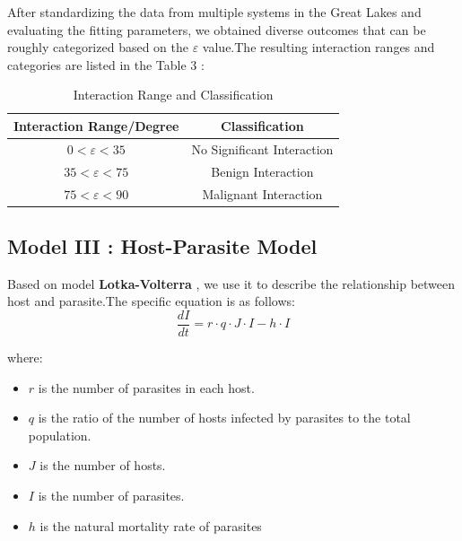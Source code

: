 \documentclass[12pt]{article}  %
\begin{document}
After standardizing the data from multiple systems in the Great Lakes and evaluating the fitting parameters, we obtained diverse outcomes that can be roughly categorized based on the $\varepsilon$ value.The resulting interaction ranges and categories are listed in the Table 3 :

\begin{table}[htbp]
	\begin{center}
		\caption{Interaction Range and Classification}
		\resizebox{\textwidth}{!}
		{\begin{tabular}{c c}
				\toprule[2pt]
				\multicolumn{1}{m{5cm}}{\centering \textbf{Interaction Range/Degree}}
				&\multicolumn{1}{m{10cm}}{\centering \textbf {Classification} }\\ %
				\midrule
				$0<\varepsilon<35$& No Significant Interaction\\
				$35<\varepsilon<75$ &Benign Interaction\\
				$75<\varepsilon<90$ & Malignant Interaction \\
				\bottomrule[2pt]
		\end{tabular}}
	\end{center}
\end{table}
\vspace{-0.8cm}
\subsection{Model III : Host-Parasite Model}
Based on model \textbf{Lotka-Volterra }, we use it to describe the relationship between host and parasite.The specific equation is as follows:
\begin{equation}
	\frac{dI}{dt}=r\cdot q\cdot J\cdot I-h\cdot I
\end{equation}

where:
\begin{itemize}
	\setlength{\parsep}{0ex} %
	\setlength{\topsep}{2ex} %
	\setlength{\itemsep}{1ex} %
	\item $r$ is the number of parasites in each host.
	\item $q$ is the ratio of the number of hosts infected by parasites to the total population.
	\item $J$ is the number of hosts.
	\item $I$ is the number of parasites.
	\item $h$ is the natural mortality rate of parasites
\end{itemize}
\end{document}
